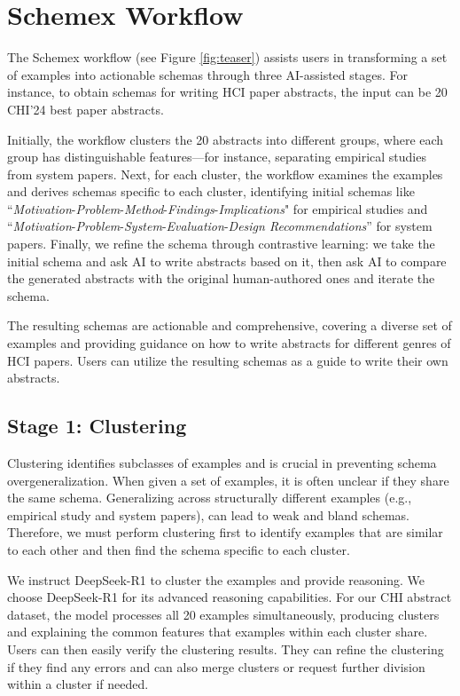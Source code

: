 \section{Schemex Workflow}

The Schemex workflow (see Figure \ref{fig:teaser}) assists users in transforming a set of examples into actionable schemas through three AI-assisted stages.
For instance, to obtain schemas for writing HCI paper abstracts, the input can be 20 CHI’24 best paper abstracts.  

Initially, the workflow clusters the 20 abstracts into different groups, where each group has distinguishable features—for instance, separating empirical studies from system papers.  
Next, for each cluster, the workflow examines the examples and derives schemas specific to each cluster, identifying initial schemas like ``\textit{Motivation}-\textit{Problem}-\textit{Method}-\textit{Findings}-\textit{Implications}" for empirical studies and ``\textit{Motivation}-\textit{Problem}-\textit{System}-\textit{Evaluation}-\textit{Design Recommendations}'' for system papers.  
Finally, we refine the schema through contrastive learning: we take the initial schema and ask AI to write abstracts based on it, then ask AI to compare the generated abstracts with the original human-authored ones and iterate the schema.  

The resulting schemas are actionable and comprehensive, covering a diverse set of examples and providing guidance on how to write abstracts for different genres of HCI papers.
Users can utilize the resulting schemas as a guide to write their own abstracts. 


\subsection{Stage 1: Clustering}
Clustering identifies subclasses of examples and is crucial in preventing schema overgeneralization.  
When given a set of examples, it is often unclear if they share the same schema.  
Generalizing across structurally different examples (e.g., empirical study and system papers), can lead to weak and bland schemas.  
Therefore, we must perform clustering first to identify examples that are similar to each other and then find the schema specific to each cluster.

We instruct DeepSeek-R1 to cluster the examples and provide reasoning.
We choose DeepSeek-R1 for its advanced reasoning capabilities.
For our CHI abstract dataset, the model processes all 20 examples simultaneously, producing clusters and explaining the common features that examples within each cluster share.
Users can then easily verify the clustering results.
They can refine the clustering if they find any errors and can also merge clusters or request further division within a cluster if needed.

